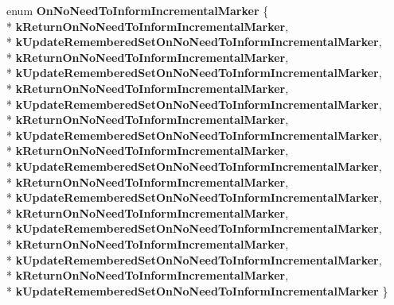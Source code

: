 \begin{DoxyCompactItemize}
\item 
enum {\bfseries On\+No\+Need\+To\+Inform\+Incremental\+Marker} \{ \\*
{\bfseries k\+Return\+On\+No\+Need\+To\+Inform\+Incremental\+Marker}, 
\\*
{\bfseries k\+Update\+Remembered\+Set\+On\+No\+Need\+To\+Inform\+Incremental\+Marker}, 
\\*
{\bfseries k\+Return\+On\+No\+Need\+To\+Inform\+Incremental\+Marker}, 
\\*
{\bfseries k\+Update\+Remembered\+Set\+On\+No\+Need\+To\+Inform\+Incremental\+Marker}, 
\\*
{\bfseries k\+Return\+On\+No\+Need\+To\+Inform\+Incremental\+Marker}, 
\\*
{\bfseries k\+Update\+Remembered\+Set\+On\+No\+Need\+To\+Inform\+Incremental\+Marker}, 
\\*
{\bfseries k\+Return\+On\+No\+Need\+To\+Inform\+Incremental\+Marker}, 
\\*
{\bfseries k\+Update\+Remembered\+Set\+On\+No\+Need\+To\+Inform\+Incremental\+Marker}, 
\\*
{\bfseries k\+Return\+On\+No\+Need\+To\+Inform\+Incremental\+Marker}, 
\\*
{\bfseries k\+Update\+Remembered\+Set\+On\+No\+Need\+To\+Inform\+Incremental\+Marker}, 
\\*
{\bfseries k\+Return\+On\+No\+Need\+To\+Inform\+Incremental\+Marker}, 
\\*
{\bfseries k\+Update\+Remembered\+Set\+On\+No\+Need\+To\+Inform\+Incremental\+Marker}, 
\\*
{\bfseries k\+Return\+On\+No\+Need\+To\+Inform\+Incremental\+Marker}, 
\\*
{\bfseries k\+Update\+Remembered\+Set\+On\+No\+Need\+To\+Inform\+Incremental\+Marker}, 
\\*
{\bfseries k\+Return\+On\+No\+Need\+To\+Inform\+Incremental\+Marker}, 
\\*
{\bfseries k\+Update\+Remembered\+Set\+On\+No\+Need\+To\+Inform\+Incremental\+Marker}, 
\\*
{\bfseries k\+Return\+On\+No\+Need\+To\+Inform\+Incremental\+Marker}, 
\\*
{\bfseries k\+Update\+Remembered\+Set\+On\+No\+Need\+To\+Inform\+Incremental\+Marker}
 \}\hypertarget{classv8_1_1internal_1_1_record_write_stub_a73c74b063dd8faec52398bc09bd68bce}{}\label{classv8_1_1internal_1_1_record_write_stub_a73c74b063dd8faec52398bc09bd68bce}

\end{DoxyCompactItemize}
